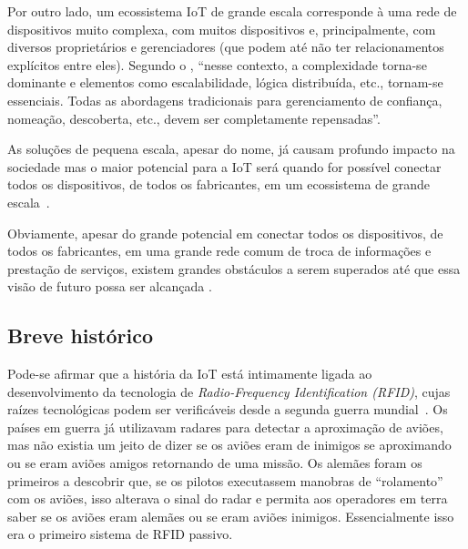 \documentclass[pdftex, brazil, 12pt, twoside]{article}
\newcommand{\ingles}[1]{\textit{#1}}
\begin{document}
Por outro lado, um ecossistema IoT de grande escala corresponde à uma rede
de dispositivos muito complexa, com muitos dispositivos e, principalmente, com
diversos proprietários e gerenciadores (que podem até não ter relacionamentos
explícitos entre eles). Segundo o \citet{IEEEIoTDefinition}, ``nesse contexto,
a complexidade torna-se dominante e elementos como escalabilidade, lógica distribuída,
etc., tornam-se essenciais. Todas as abordagens tradicionais para gerenciamento
de confiança, nomeação, descoberta, etc., devem ser completamente repensadas''.

As soluções de pequena escala, apesar do nome, já causam profundo impacto na sociedade
mas o maior potencial para a IoT será quando for possível conectar todos os dispositivos,
de todos os fabricantes, em um ecossistema de grande escala~\citep{UKGOSWalportIoT2014,IEEEIoTDefinition,BhattIoT,IEEEIoTReport,McKinseyIoTHype,MoolayilIoT2016,RajIoT2017,OliverWymanIoT2015,SAPFutureIoT,CiscoIoEPublicSectorOpportunity,CiscoIoTFAQ2013,CiscoIoTVS2013,CiscoIoEPublicSectorEconomicAnalysis,CiscoIoESurvey2013,CiscoIoEValuePrivate2013,CiscoIoEValuePublic2013}.

Obviamente, apesar do grande potencial em conectar todos os dispositivos, de todos
os fabricantes, em uma grande rede comum de troca de informações e prestação de
serviços, existem grandes obstáculos a serem superados até que essa visão de futuro
possa ser alcançada \citep{UKGOSWalportIoT2014}.


\subsection{Breve histórico}
\label{o-que-e-iot-historia}

Pode-se afirmar que a história da IoT está intimamente ligada ao desenvolvimento
da tecnologia de \ingles{Radio-Frequency Identification (RFID)}, cujas raízes
tecnológicas podem ser verificáveis desde a segunda guerra mundial~\citep{IEEEIoTDefinition}.
Os países em guerra já utilizavam radares para detectar a aproximação de aviões,
mas não existia um jeito de dizer se os aviões eram de inimigos se aproximando
ou se eram aviões amigos retornando de uma missão. Os alemães foram os
primeiros a descobrir que, se os pilotos executassem manobras de ``rolamento''
com os aviões, isso alterava o sinal do radar e permita aos operadores em terra
saber se os aviões eram alemães ou se eram aviões inimigos. Essencialmente
isso era o primeiro sistema de RFID passivo.
\end{document}
